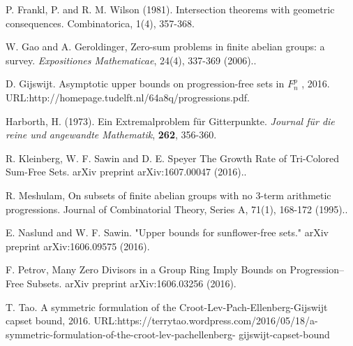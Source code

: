 \documentclass[12pt]{article}
\begin{document}
\begin{thebibliography}{MM}
  P. Frankl, P. and R. M. Wilson (1981). Intersection theorems with geometric consequences. Combinatorica, 1(4), 357-368.

 W. Gao and A. Geroldinger,  Zero-sum problems in finite abelian groups: a survey. {\em Expositiones Mathematicae}, 24(4), 337-369 (2006)..

 D. Gijswijt. Asymptotic upper bounds on progression-free sets in $F_n^p$ , 2016.
URL:http://homepage.tudelft.nl/64a8q/progressions.pdf.

 Harborth, H. (1973). Ein Extremalproblem für Gitterpunkte. {\em Journal für die reine und angewandte Mathematik}, {\bf 262}, 356-360.

 R. Kleinberg, W. F. Sawin and D. E. Speyer  The Growth Rate of Tri-Colored Sum-Free Sets. arXiv preprint arXiv:1607.00047 (2016)..



 R. Meshulam, On subsets of finite abelian groups with no 3-term arithmetic progressions. Journal of Combinatorial Theory, Series A, 71(1), 168-172  (1995)..

 E. Naslund  and W. F. Sawin. "Upper bounds for sunflower-free sets." arXiv preprint arXiv:1606.09575 (2016).



 F. Petrov, Many Zero Divisors in a Group Ring Imply Bounds on Progression--Free Subsets. arXiv preprint arXiv:1606.03256 (2016).

 T. Tao. A symmetric formulation of the Croot-Lev-Pach-Ellenberg-Gijswijt capset bound,
2016. URL:https://terrytao.wordpress.com/2016/05/18/a-symmetric-formulation-of-the-croot-lev-pachellenberg-
gijswijt-capset-bound


\end{thebibliography}
\end{document}
